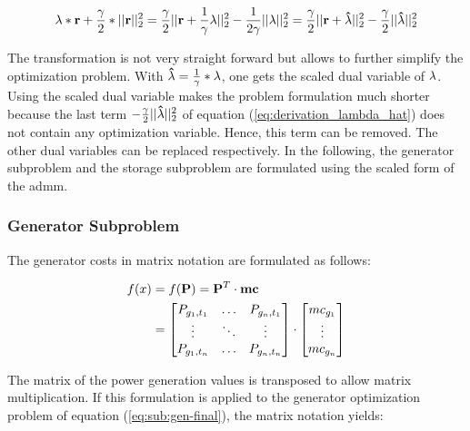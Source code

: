 \begin{equation}
	\vb{\lambda} * \vb{r} + \frac{\gamma}{2} * || \vb{r} ||^2_2 = \frac{\gamma}{2} || \vb{r} + \frac{1}{\gamma}\vb{\lambda} ||^2_2 - \frac{1}{2\gamma}|| \vb{\lambda} ||^2_2 = \frac{\gamma}{2} || \vb{r} + \vb{\hat{\lambda}} ||^2_2 - \frac{\gamma}{2}|| \vb{\hat{\lambda}} ||^2_2 \label{eq:derivation_lambda_hat}
\end{equation}

The transformation is not very straight forward but allows to further simplify the  optimization problem. With $\vb{\hat{\lambda}} = \frac{1}{\gamma}*\vb{\lambda}$, one gets the scaled dual variable of $\vb{\lambda}$. Using the scaled dual variable makes the problem formulation much shorter because the last term $- \frac{\gamma}{2}|| \vb{\hat{\lambda}} ||^2_2$ of equation (\ref{eq:derivation_lambda_hat}) does not contain any optimization variable. Hence, this term can be removed. The other dual variables can be replaced respectively. In the following, the generator subproblem and the storage subproblem are formulated using the scaled form of the \gls{admm}.

\subsubsection*{Generator Subproblem}

The generator costs in matrix notation are formulated as follows:

\begin{subequations}
	\begin{align}
		f(x) &= f(\vb{P}) = \vb{P}^T \cdot \vb{mc}\\
		& = \begin{bmatrix}
			P_{g_1,t_1} & \dots & P_{g_n,t_1} \\
			\vdots & \ddots & \vdots \\
			P_{g_1,t_n} & \dots & P_{g_n,t_n}
		\end{bmatrix} \cdot \begin{bmatrix}
			mc_{g_1} \\
			\vdots \\
			mc_{g_n}
		\end{bmatrix}
	\end{align}
\end{subequations}

The matrix of the power generation values is transposed to allow matrix multiplication. If this formulation is applied to the generator optimization problem of equation (\ref{eq:sub:gen-final}), the matrix notation yields:

